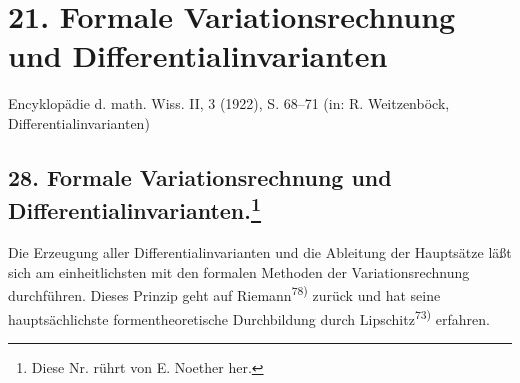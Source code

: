 \section*{21. Formale Variationsrechnung und Differentialinvarianten}
\begin{center}
Encyklopädie d. math. Wiss. II, 3 (1922), S. 68--71 (in: R. Weitzenböck, Differentialinvarianten)
\end{center}

\begingroup
\renewcommand{\thefootnote}{\arabic{footnote})}
\setcounter{footnote}{148}
\subsection*{28. Formale Variationsrechnung und Differentialinvarianten.\footnote{Diese Nr. rührt von E. Noether her.}}

Die Erzeugung aller Differentialinvarianten und die Ableitung der Hauptsätze läßt sich am einheitlichsten mit den formalen Methoden der Variationsrechnung durchführen. Dieses Prinzip geht auf Riemann\textsuperscript{78)} zurück und hat seine hauptsächlichste formentheoretische Durchbildung durch Lipschitz\textsuperscript{73)} erfahren.

